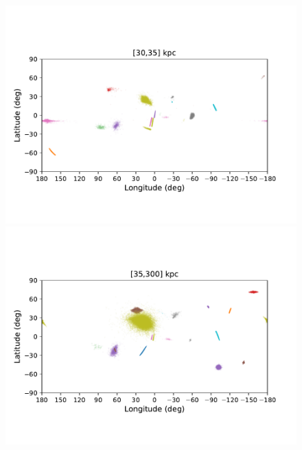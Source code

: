     \twocolumn
    \begin{figure}[h!]
        \begin{center}
            \includegraphics[clip=true, trim = 0mm 15mm 0mm 20mm, width=\columnwidth]{images/PII_ensemble_LB_D30-35_scatter.pdf}
            \includegraphics[clip=true, trim = 0mm 15mm 0mm 20mm, width=\columnwidth]{images/PII_ensemble_LB_D35-300_scatter.pdf}


\end{center}
\end{figure}
